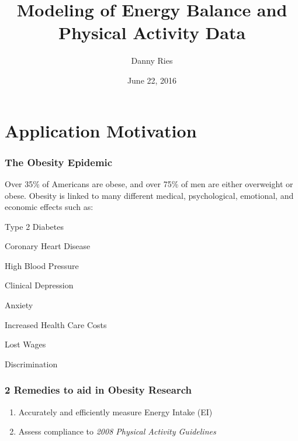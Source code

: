 \documentclass[handout]{beamer}\usepackage[]{graphicx}\usepackage[]{color}
\title{Modeling of Energy Balance and Physical Activity Data}
\author[Danny Ries]{Danny Ries}
\institute[Iowa State]{Iowa State University}
\date{June 22, 2016}
\begin{document}







\frame{\maketitle}

\section{Application Motivation}
\begin{frame}
\frametitle{The Obesity Epidemic}

Over 35\% of Americans are obese, and over  75\% of men are either overweight or obese. Obesity is linked to many different medical, psychological, emotional, and economic effects such as:
\begin{itemize}
\begin{multicols}{2}
\item
Type 2 Diabetes
\item
Coronary Heart Disease
\item
High Blood Pressure
\item 
Clinical Depression
\columnbreak
\item
Anxiety
\item 
Increased Health Care Costs
\item
Lost Wages
\item
Discrimination
\end{multicols}
\end{itemize}

\end{frame}






\begin{frame}
\frametitle{2 Remedies to aid in Obesity Research}
\begin{enumerate}
\item
Accurately and efficiently measure Energy Intake (EI)

\vspace{0.2cm}

\item
Assess compliance to \emph{2008 Physical Activity Guidelines}
\end{enumerate}



\end{frame}
\end{document}
